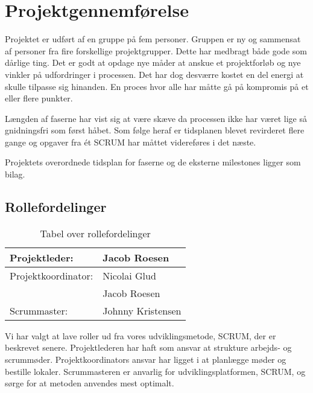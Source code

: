 \section{Projektgennemførelse}
Projektet er udført af en gruppe på fem personer. Gruppen er ny og sammensat af personer fra fire forskellige projektgrupper. Dette har medbragt både gode som dårlige ting. Det er godt at opdage nye måder at anskue et projektforløb og nye vinkler på udfordringer i processen. Det har dog desværre kostet en del energi at skulle tilpasse sig hinanden. En proces hvor alle har måtte gå på kompromis på et eller flere punkter.

Længden af faserne har vist sig at være skæve da processen ikke har været lige så gnidningsfri som først håbet. Som følge heraf er tidsplanen blevet revirderet flere gange og opgaver fra ét SCRUM har måttet videreføres i det næste.

Projektets overordnede tidsplan for faserne og de eksterne milestones ligger som bilag.

\subsection{Rollefordelinger}
\begin{table}[H]
\centering
\begin{tabular}{|l|l|} \hline
Projektleder: &Jacob Roesen\\\hline
Projektkoordinator: &Nicolai Glud\\
	&Jacob Roesen\\\hline
Scrummaster: &Johnny Kristensen\\\hline
\end{tabular}
\caption{Tabel over rollefordelinger}
\label{table:roller}
\end{table}
Vi har valgt at lave roller ud fra vores udviklingsmetode, SCRUM, der er beskrevet senere. Projektlederen har haft som ansvar at strukture arbejds- og scrummøder. Projektkoordinators ansvar har ligget i at planlægge møder og bestille lokaler. Scrummasteren er anvarlig for udviklingsplatformen, SCRUM, og sørge for at metoden anvendes mest optimalt. 